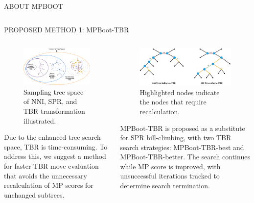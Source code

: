 \documentclass[%
  final,%
  english,%
]{beamer}
\begin{document}
\begin{frame}[t, fragile = singleslide]
\begin{columns}[t, onlytextwidth]
\begin{column}{0.48\textwidth}
\begin{block}{ABOUT MPBOOT}
\end{block}
%
\end{column}
%
\end{columns}

\begin{columns}[t, onlytextwidth]
%
\begin{column}{\textwidth}
%
\begin{block}{PROPOSED METHOD 1: MPBoot-TBR}

\begin{columns}

\begin{column}{0.48\textwidth} 
\begin{figure}
\centering%
\includegraphics[width = 0.78\columnwidth]{./Figuras/3-operations.drawio.png}
\caption{Sampling tree space of NNI, SPR, and TBR transformation illustrated.}%
\end{figure}
Due to the enhanced tree search space, TBR is time-consuming. To address this, we suggest a method for faster TBR move evaluation that avoids the unnecessary recalculation of MP scores for unchanged subtrees. \\
\vspace{0.8cm}
\end{column} 

\begin{column}{0.45\textwidth}
\begin{figure}
\centering%
\includegraphics[width = 0.8\columnwidth]{./Figuras/tbr-recalculated-nodes.drawio.png}
\caption{Highlighted nodes indicate the nodes that require recalculation.}%
\end{figure}
\vspace{0.6cm}
MPBoot-TBR is proposed as a substitute for SPR hill-climbing, with two TBR search strategies: MPBoot-TBR-best and MPBoot-TBR-better. The search continues while MP score is improved, with unsuccessful iterations tracked to determine search termination.
\end{column}


\end{columns}
\end{block}
\end{column}
\end{columns}
\end{frame}
\end{document}
